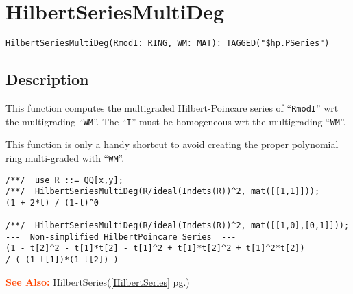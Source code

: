 \documentclass[a4paper]{mybook}
\newenvironment{command}{}{} %
\newcommand\SeeAlso{\par\textcolor{OrangeRed}{\textbf{\large See Also: }}}
\begin{document}
\section{HilbertSeriesMultiDeg}
\label{HilbertSeriesMultiDeg}
\begin{command} %


\begin{Verbatim}[label=syntax, rulecolor=\color{MidnightBlue},
frame=single]
HilbertSeriesMultiDeg(RmodI: RING, WM: MAT): TAGGED("$hp.PSeries")
\end{Verbatim}


\subsection*{Description}

This function computes the multigraded Hilbert-Poincare series
of ``\verb&RmodI&'' wrt the multigrading ``\verb&WM&''.
The ``\verb&I&'' must be homogeneous wrt the multigrading ``\verb&WM&''.
\par 
This function is only a handy shortcut to avoid creating the proper
polynomial ring multi-graded with ``\verb&WM&''.
\begin{Verbatim}[label=example, rulecolor=\color{PineGreen}, frame=single]
/**/  use R ::= QQ[x,y];
/**/  HilbertSeriesMultiDeg(R/ideal(Indets(R))^2, mat([[1,1]]));
(1 + 2*t) / (1-t)^0

/**/  HilbertSeriesMultiDeg(R/ideal(Indets(R))^2, mat([[1,0],[0,1]]));
---  Non-simplified HilbertPoincare Series  ---
(1 - t[2]^2 - t[1]*t[2] - t[1]^2 + t[1]*t[2]^2 + t[1]^2*t[2])
/ ( (1-t[1])*(1-t[2]) )
\end{Verbatim}


\SeeAlso %
  HilbertSeries(\ref{HilbertSeries} pg.\pageref{HilbertSeries})
\end{command} %
\end{document}
